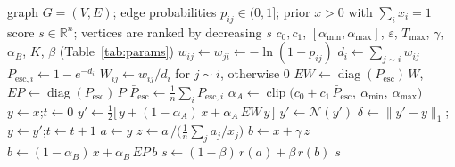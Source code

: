 \documentclass[11pt,a4paper]{article}
\newcommand{\Pesc}{P_{\mathrm{esc}}}
\newcommand{\Pescbar}{\bar{P}_{\mathrm{esc}}}
\newcommand{\N}{\mathcal{N}}
\DeclareMathOperator{\clip}{clip}
\DeclareMathOperator{\diag}{diag}
\begin{document}
\begin{algorithm}[H]
\caption{W1 --- dual-operator polishing with rank fusion}\label{alg:w1}
\small
\begin{algorithmic}[1]
\Require graph $G=(V,E)$; edge probabilities $p_{ij}\in(0,1]$; prior $x>0$ with $\sum_i x_i=1$
\Ensure score $s\in\mathbb{R}^n$; vertices are ranked by decreasing $s$
\Params $c_0,c_1$, $[\alpha_{\min},\alpha_{\max}]$, $\varepsilon$, $T_{\max}$, $\gamma$, $\alpha_B$, $K$, $\beta$ (Table~\ref{tab:params})
  \State $w_{ij}\gets w_{ji}\gets -\ln(1-p_{ij})$\label{line:w} 
\EndFor
{}
  \State $d_i\gets\sum_{j\sim i}w_{ij}$
  \State $P_{\mathrm{esc},i}\gets 1-e^{-d_i}$ 
\EndFor
\State $W_{ij}\gets w_{ij}/d_i$ for $j\sim i$, otherwise $0$ 
\State $EW\gets\diag(\Pesc)\,W$, \quad $EP\gets\diag(\Pesc)\,P$ 
\State $\Pescbar\gets\frac1n\sum_iP_{\mathrm{esc},i}$
\State $\alpha_A\gets\clip\big(c_0+c_1\,\Pescbar,\ \alpha_{\min},\ \alpha_{\max}\big)$ 
\State $y\gets x$;\quad $t\gets 0$
\Repeat
  \State $y'\gets\tfrac12\big[\,y+(1-\alpha_A)\,x+\alpha_A\,EW\,y\,\big]$ 
  \State $y'\gets\N(y')$
  \State $\delta\gets\lVert y'-y\rVert_1$;\quad $y\gets y'$;\quad $t\gets t+1$
\State $a\gets y$
\State $z\gets a\,\Big/\Big(\frac1n\sum_j a_j/x_j\Big)$\label{line:z} 
\State $b\gets x+\gamma\,z$ 
  \State $b\gets(1-\alpha_B)\,x+\alpha_B\,EP\,b$ 
\EndFor
{}
\State $s\gets(1-\beta)\,r(a)+\beta\,r(b)$
\State \Return $s$
\end{algorithmic}
\end{algorithm}
\end{document}
